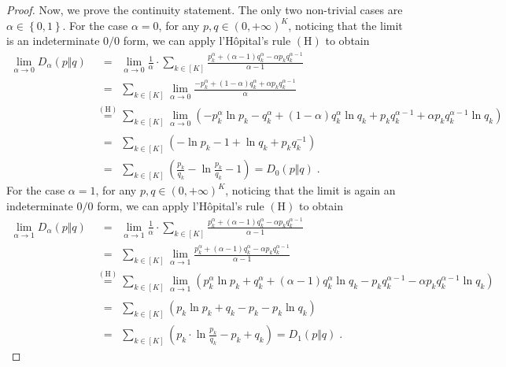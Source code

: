 \documentclass[11pt,oneside,a4paper]{article}
\newcommand{\lrb}[1]{\left(#1\right)}
\newcommand{\lcb}[1]{\left\{#1\right\}}
\theoremstyle{plain}
\theoremstyle{definition}
\theoremstyle{remark}
\begin{document}
{\begin{proof}
Now, we prove the continuity statement.
The only two non-trivial cases are $\alpha \in \lcb{0,1}$.
For the case $\alpha = 0$, for any $p,q \in (0,+\infty)^K$, noticing that the limit is an indeterminate $0/0$ form, we can apply l'Hôpital's rule $(\mathrm{H})$ to obtain
\begin{align*}
    \lim_{\alpha \to 0}D_\alpha(p \Vert q)
&\overset{\phantom{(\mathrm{H})}}{=}
    \lim_{\alpha \to 0}\frac{1}{\alpha} \cdot \sum_{k \in [K]} \frac{p_k^\alpha + (\alpha-1)q_k^\alpha-\alpha p_kq_k^{\alpha-1}}{\alpha-1}
\\
&\overset{\phantom{(\mathrm{H})}}{=}
    \sum_{k \in [K]} \lim_{\alpha \to 0} \frac{-p_k^\alpha + (1-\alpha)q_k^\alpha+\alpha p_kq_k^{\alpha-1}}{\alpha}
\\
&\overset{(\mathrm{H})}{=}
    \sum_{k \in [K]} \lim_{\alpha \to 0} \lrb{-p_k^\alpha \ln p_k -q_k^\alpha+(1-\alpha)q_k^\alpha \ln q_k+p_kq_k^{\alpha-1}+\alpha p_kq_k^{\alpha-1} \ln q_k}
\\
&\overset{\phantom{(\mathrm{H})}}{=}
    \sum_{k \in [K]} \lrb{ -\ln p_k -1+\ln q_k+p_kq_k^{-1}}
\\
&\overset{\phantom{(\mathrm{H})}}{=}
    \sum_{k \in [K]}\lrb{ \frac{p_k}{q_k} -\ln\frac{p_k}{q_k} -1 }
=
    D_0(p\Vert q)\;.
\end{align*}
For the case $\alpha = 1$, for any $p,q \in (0,+\infty)^K$, noticing that the limit is again an indeterminate $0/0$ form,
we can apply l'Hôpital's rule $(\mathrm{H})$ to obtain
\begin{align*}
    \lim_{\alpha \to 1}D_\alpha(p \Vert q)
&\overset{\phantom{(\mathrm{H})}}{=}
    \lim_{\alpha \to 1}\frac{1}{\alpha} \cdot \sum_{k \in [K]} \frac{p_k^\alpha + (\alpha-1)q_k^\alpha-\alpha p_kq_k^{\alpha-1}}{\alpha-1}
\\
&\overset{\phantom{(\mathrm{H})}}{=}
    \sum_{k \in [K]} \lim_{\alpha \to 1} \frac{p_k^\alpha + (\alpha-1)q_k^\alpha-\alpha p_kq_k^{\alpha-1}}{\alpha-1}
\\
&\overset{(\mathrm{H})}{=}
    \sum_{k \in [K]} \lim_{\alpha \to 1} \lrb{p_k^\alpha \ln p_k +q_k^\alpha+(\alpha-1)q_k^\alpha \ln q_k-p_kq_k^{\alpha-1}-\alpha p_kq_k^{\alpha-1} \ln q_k}
\\
&\overset{\phantom{(\mathrm{H})}}{=}
    \sum_{k \in [K]} \lrb{p_k \ln p_k +q_k-p_k-p_k \ln q_k}
\\
&\overset{\phantom{(\mathrm{H})}}{=}
    \sum_{k \in [K]} \lrb{ p_k \cdot\ln\frac{p_k}{q_k} - p_k + q_k}
=
    D_1(p\Vert q)\;.
\end{align*}
\end{proof}
}
\end{document}
